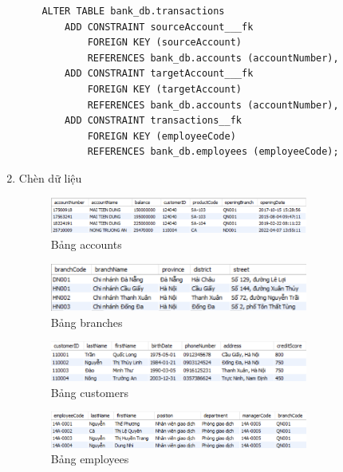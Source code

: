 \begin{enumerate}[label=\alph*.]
\begin{lstlisting}
    ALTER TABLE bank_db.transactions
        ADD CONSTRAINT sourceAccount___fk
            FOREIGN KEY (sourceAccount) 
            REFERENCES bank_db.accounts (accountNumber),
        ADD CONSTRAINT targetAccount___fk
            FOREIGN KEY (targetAccount) 
            REFERENCES bank_db.accounts (accountNumber),
        ADD CONSTRAINT transactions__fk
            FOREIGN KEY (employeeCode) 
            REFERENCES bank_db.employees (employeeCode);
    \end{lstlisting}

    \item Chèn dữ liệu
    
    \begin{figure}[H]
        \centering
        \includegraphics[width=0.8\textwidth]{sample-accounts.png}
        \caption{Bảng accounts}
    \end{figure}

    \begin{figure}[H]
        \centering
        \includegraphics[width=0.8\textwidth]{sample-branches.png}
        \caption{Bảng branches}
    \end{figure}

    \begin{figure}[H]
        \centering
        \includegraphics[width=0.8\textwidth]{sample-customers.png}
        \caption{Bảng customers}
    \end{figure}

    \begin{figure}[H]
        \centering
        \includegraphics[width=0.8\textwidth]{sample-employees.png}
        \caption{Bảng employees}
    \end{figure}


\end{enumerate}
